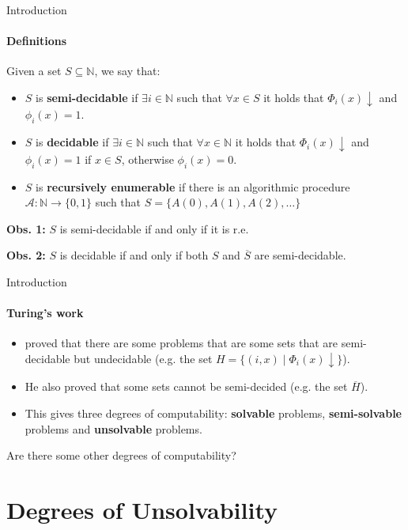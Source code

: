 \documentclass{beamer}
\newcommand{\N}{\mathbb{N}}                     %
\begin{document}
\begin{frame}{Introduction}
\framesubtitle{Definitions}
    Given a set $S \subseteq \N$, we say that:
    \begin{itemize}[<+->]
        \item $S$ is \textbf{semi-decidable} if $\exists i \in \N$ such that $\forall x \in S$ it holds that $\Phi_i(x) \downarrow$ and $\phi_i(x) = 1$.
        \item $S$ is \textbf{decidable} if $\exists i \in \N$ such that $\forall x \in \N$ it holds that $\Phi_i(x) \downarrow$ and $\phi_i(x) = 1$ if $x \in S$, otherwise $\phi_i(x) = 0$.
        \item $S$ is \textbf{recursively enumerable} if there is an algorithmic procedure $\mathcal{A} : \N \to \{0,1\}$ such that $S = \{A(0), A(1), A(2), \ldots\}$
    \end{itemize}

    \uncover<+-> {
        \textbf{Obs. 1:} $S$ is semi-decidable if and only if it is r.e.

        \textbf{Obs. 2:} $S$ is decidable if and only if both $S$ and $\overline{S}$ are semi-decidable.
    }
\end{frame}

\begin{frame}{Introduction}
\framesubtitle{Turing's work}
    \begin{itemize}[<+->]
        \item \textcite{turing} proved that there are some problems that are some sets that are semi-decidable but undecidable (e.g. the set $H = \{(i,x) \mid \Phi_i(x) \downarrow\}$).
        
        \item He also proved that some sets cannot be semi-decided (e.g. the set $\overline{H}$).
        
        \item This gives three degrees of computability: \textbf{solvable} problems, \textbf{semi-solvable} problems and \textbf{unsolvable} problems.
        
    \end{itemize}

    \uncover<+-> {
        Are there some other degrees of computability?
    }
\end{frame}

\section{Degrees of Unsolvability}
\end{document}
